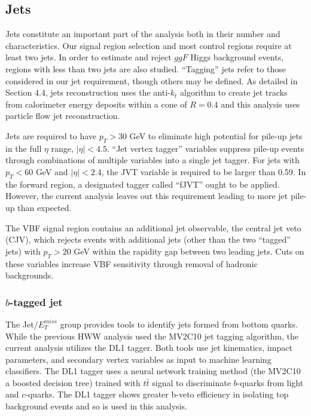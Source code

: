 \subsection{Jets}

Jets constitute an important part of the analysis both in their number and characteristics. Our signal region selection and most control regions require at least two jets. In order to estimate and reject $ggF$ Higgs background events, regions with less than two jets are also studied. ``Tagging'' jets refer to those considered in our jet requirement, though others may be defined. As detailed in Section 4.4, jets reconstruction uses the anti-$k_t$ algorithm to create jet tracks from calorimeter energy deposits within a cone of $R = 0.4$ and this analysis uses particle flow jet reconstruction.   

Jets are required to have $p_T > 30$ GeV to eliminate high potential for pile-up jets in the full $\eta$ range, $|\eta| < 4.5$. ``Jet vertex tagger'' variables suppress pile-up events through combinations of multiple variables into a single jet tagger. For jets with $p_T < 60$ GeV and $|\eta| < 2.4$, the JVT variable is required to be larger than 0.59. In the forward region, a designated tagger called ``fJVT'' ought to be applied. However, the current analysis leaves out this requirement leading to more jet pile-up than expected. 

The VBF signal region contains an additional jet observable, the central jet veto (CJV), which rejects events with additional jets (other than the two ``tagged'' jets) with $p_T>20$ GeV within the rapidity gap between two leading jets. Cuts on these variables increase VBF sensitivity through removal of hadronic backgrounds.
\subsubsection{$b$-tagged jet}

The Jet/$E_T^{miss}$ group provides tools to identify jets formed from bottom quarks. While the previous HWW analysis \cite{Aaboud_2019} used the MV2C10 jet tagging algorithm, the current analysis utilizes the DL1 tagger. Both tools use jet kinematics, impact parameters, and secondary vertex variables as input to machine learning classifiers. The DL1 tagger uses a neural network training method (the MV2C10 a boosted decision tree) trained with $t\bar{t}$ signal to discriminate $b$-quarks from light and $c$-quarks. The DL1 tagger shows greater b-veto efficiency in isolating top background events and so is used in this analysis. 


